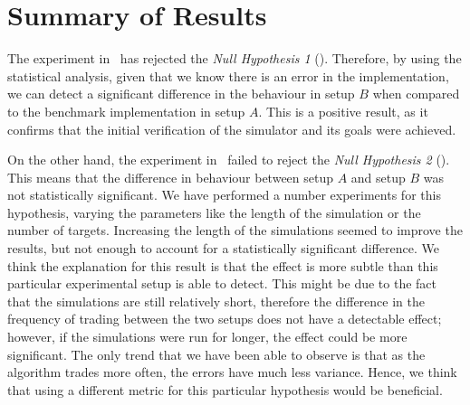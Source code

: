 \FloatBarrier
\section{Summary of Results}
The experiment in~ has rejected the \textit{Null Hypothesis 1} (). Therefore, by using the statistical analysis, given that we know there is an error in the implementation, we can detect a significant difference in the behaviour in setup $B$ when compared to the benchmark implementation in setup $A$. This is a positive result, as it confirms that the initial verification of the simulator and its goals were achieved.

On the other hand, the experiment in~ failed to reject the \textit{Null Hypothesis 2} (). This means that the difference in behaviour between setup $A$ and setup $B$ was not statistically significant. We have performed a number experiments for this hypothesis, varying the parameters like the length of the simulation or the number of targets. Increasing the length of the simulations seemed to improve the results, but not enough to account for a statistically significant difference. We think the explanation for this result is that the effect is more subtle than this particular experimental setup is able to detect. This might be due to the fact that the simulations are still relatively short, therefore the difference in the frequency of trading between the two setups does not have a detectable effect; however, if the simulations were run for longer, the effect could be more significant. The only trend that we have been able to observe is that as the algorithm trades more often, the errors have much less variance. Hence, we think that using a different metric for this particular hypothesis would be beneficial.
